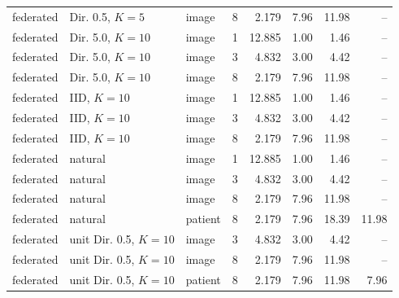 {\begin{longtable}{lllrrrrr}
federated & Dir. 0.5, $K{=}5$ & image & 8 & 2.179 & 7.96 & 11.98 & -- \\
federated & Dir. 5.0, $K{=}10$ & image & 1 & 12.885 & 1.00 & 1.46 & -- \\
federated & Dir. 5.0, $K{=}10$ & image & 3 & 4.832 & 3.00 & 4.42 & -- \\
federated & Dir. 5.0, $K{=}10$ & image & 8 & 2.179 & 7.96 & 11.98 & -- \\
federated & IID, $K{=}10$ & image & 1 & 12.885 & 1.00 & 1.46 & -- \\
federated & IID, $K{=}10$ & image & 3 & 4.832 & 3.00 & 4.42 & -- \\
federated & IID, $K{=}10$ & image & 8 & 2.179 & 7.96 & 11.98 & -- \\
federated & natural & image & 1 & 12.885 & 1.00 & 1.46 & -- \\
federated & natural & image & 3 & 4.832 & 3.00 & 4.42 & -- \\
federated & natural & image & 8 & 2.179 & 7.96 & 11.98 & -- \\
federated & natural & patient & 8 & 2.179 & 7.96 & 18.39 & 11.98 \\
federated & unit Dir. 0.5, $K{=}10$ & image & 3 & 4.832 & 3.00 & 4.42 & -- \\
federated & unit Dir. 0.5, $K{=}10$ & image & 8 & 2.179 & 7.96 & 11.98 & -- \\
federated & unit Dir. 0.5, $K{=}10$ & patient & 8 & 2.179 & 7.96 & 11.98 & 7.96 \\
\end{longtable}}
\par{}

